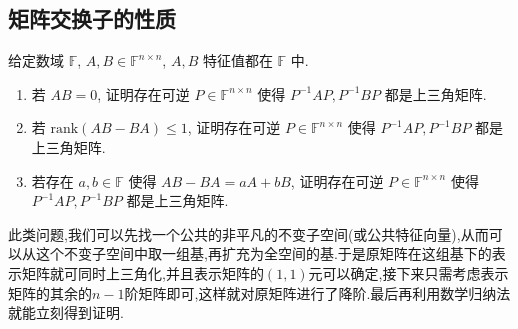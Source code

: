 \documentclass[../../main.tex]{subfiles}%
\begin{document}
\subsection{矩阵交换子的性质}

\begin{proposition}\label{proposition:两个矩阵可同时上三角化的条件}
给定数域 \( \mathbb{F} \), \( A, B \in \mathbb{F}^{n \times n} \), \( A, B \) 特征值都在 \( \mathbb{F} \) 中.
\begin{enumerate}[(1)]
\item 若 \( AB = 0 \), 证明存在可逆 \( P \in \mathbb{F}^{n \times n} \) 使得 \( P^{-1}AP, P^{-1}BP \) 都是上三角矩阵.

\item 若 \( \mathrm{rank}(AB - BA) \leqslant 1 \), 证明存在可逆 \( P \in \mathbb{F}^{n \times n} \) 使得 \( P^{-1}AP, P^{-1}BP \) 都是上三角矩阵.

\item 若存在 \( a, b \in \mathbb{F} \) 使得 \( AB - BA = aA + bB \), 证明存在可逆 \( P \in \mathbb{F}^{n \times n} \) 使得 \( P^{-1}AP, P^{-1}BP \) 都是上三角矩阵.
\end{enumerate}
\end{proposition}
\begin{note}
此类问题,我们可以先找一个公共的非平凡的不变子空间(或公共特征向量),从而可以从这个不变子空间中取一组基,再扩充为全空间的基.于是原矩阵在这组基下的表示矩阵就可同时上三角化,并且表示矩阵的$(1,1)$元可以确定,接下来只需考虑表示矩阵的其余的$n-1$阶矩阵即可,这样就对原矩阵进行了降阶.最后再利用数学归纳法就能立刻得到证明.
\end{note}
\end{document}
